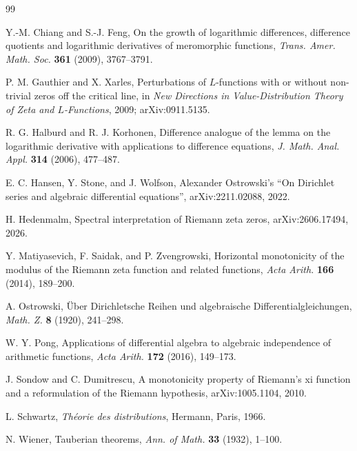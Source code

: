 \documentclass[11pt]{article}
\theoremstyle{definition}
\theoremstyle{remark}
\begin{document}
\begin{thebibliography}{99}
\small

Y.-M. Chiang and S.-J. Feng,
\newblock On the growth of logarithmic differences, difference quotients
and logarithmic derivatives of meromorphic functions,
\newblock \emph{Trans. Amer. Math. Soc.} \textbf{361} (2009),
3767--3791.

P. M. Gauthier and X. Xarles,
\newblock Perturbations of \(L\)-functions with or without non-trivial
zeros off the critical line,
\newblock in \emph{New Directions in Value-Distribution Theory of Zeta
and \(L\)-Functions}, 2009; arXiv:0911.5135.

R. G. Halburd and R. J. Korhonen,
\newblock Difference analogue of the lemma on the logarithmic derivative
with applications to difference equations,
\newblock \emph{J. Math. Anal. Appl.} \textbf{314} (2006), 477--487.

E. C. Hansen, Y. Stone, and J. Wolfson,
\newblock Alexander Ostrowski's ``On Dirichlet series and algebraic
differential equations'',
\newblock arXiv:2211.02088, 2022.

H. Hedenmalm,
\newblock Spectral interpretation of Riemann zeta zeros,
\newblock arXiv:2606.17494, 2026.

Y. Matiyasevich, F. Saidak, and P. Zvengrowski,
\newblock Horizontal monotonicity of the modulus of the Riemann zeta
function and related functions,
\newblock \emph{Acta Arith.} \textbf{166} (2014), 189--200.

A. Ostrowski,
\newblock \"Uber Dirichletsche Reihen und algebraische
Differentialgleichungen,
\newblock \emph{Math. Z.} \textbf{8} (1920), 241--298.

W. Y. Pong,
\newblock Applications of differential algebra to algebraic independence
of arithmetic functions,
\newblock \emph{Acta Arith.} \textbf{172} (2016), 149--173.

J. Sondow and C. Dumitrescu,
\newblock A monotonicity property of Riemann's xi function and a
reformulation of the Riemann hypothesis,
\newblock arXiv:1005.1104, 2010.

L. Schwartz,
\newblock \emph{Th\'eorie des distributions},
\newblock Hermann, Paris, 1966.

N. Wiener,
\newblock Tauberian theorems,
\newblock \emph{Ann. of Math.} \textbf{33} (1932), 1--100.

\end{thebibliography}
\end{document}
